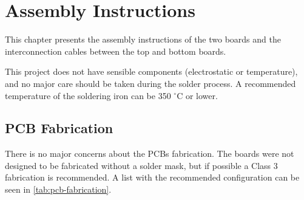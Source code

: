 %
%
%
%
%

%
%
%
%
%
%

\chapter{Assembly Instructions} \label{ch:assembly}

This chapter presents the assembly instructions of the two boards and the interconnection cables between the top and bottom boards.

This project does not have sensible components (electrostatic or temperature), and no major care should be taken during the solder process. A recommended temperature of the soldering iron can be 350 $^{\circ}$C or lower.

\section{PCB Fabrication}

There is no major concerns about the PCBs fabrication. The boards were not designed to be fabricated without a solder mask, but if possible a Class 3 fabrication is recommended. A list with the recommended configuration can be seen in \autoref{tab:pcb-fabrication}.


